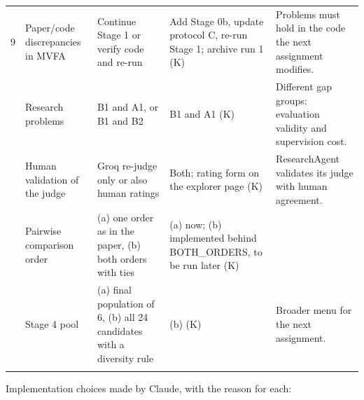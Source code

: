 \documentclass[11pt,a4paper]{article}
\begin{document}
\begin{longtable}{@{}r P{3.3cm} P{3.9cm} P{3.6cm} P{3.4cm}@{}}
9 & Paper/code discrepancies in MVFA & Continue Stage 1 or verify code and re-run & Add Stage 0b, update protocol C, re-run Stage 1; archive run 1 {\color{muted}\footnotesize(K)} & Problems must hold in the code the next assignment modifies.\\ & Research problems & B1 and A1, or B1 and B2 & B1 and A1 {\color{muted}\footnotesize(K)} & Different gap groups: evaluation validity and supervision cost.\\ & Human validation of the judge & Groq re-judge only or also human ratings & Both; rating form on the explorer page {\color{muted}\footnotesize(K)} & ResearchAgent validates its judge with human agreement.\\ & Pairwise comparison order & (a) one order as in the paper, (b) both orders with ties & (a) now; (b) implemented behind BOTH\_\allowbreak{}ORDERS, to be run later {\color{muted}\footnotesize(K)} & \\ & Stage 4 pool & (a) final population of 6, (b) all 24 candidates with a diversity rule & (b) {\color{muted}\footnotesize(K)} & Broader menu for the next assignment.\\\addlinespace[3pt]
\bottomrule\end{longtable}
Implementation choices made by Claude, with the reason for each:
\end{document}
